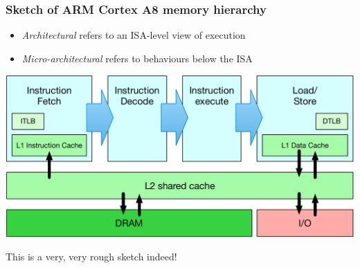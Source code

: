 \begin{frame}
  \frametitle{Sketch of ARM Cortex A8 memory hierarchy}

  \begin{itemize}
    \item \textit{Architectural} refers to an ISA-level view of execution
    \item \textit{Micro-architectural} refers to behaviours below the ISA
  \end{itemize}

  \includegraphics[width=\textwidth]{../../figures/processor-pipeline}

  \begin{scriptsize}
    This is a very, very rough sketch indeed!
  \end{scriptsize}

\end{frame}

